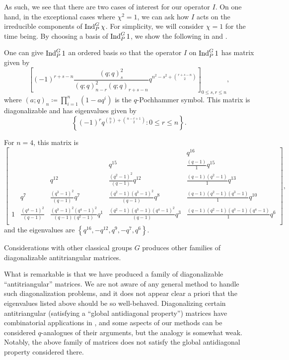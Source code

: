 \documentclass{amsart}
\begin{document}
As such, we see that there are two cases of interest for our operator $I$. On one hand, in the exceptional cases where $\chi^2=1$, we can ask how $I$ acts on the irreducible components of $\operatorname{Ind}_P^G\chi$. For simplicity, we will consider $\chi=1$ for the time being. By choosing a basis of $\operatorname{Ind}_P^G1$, we show the following in  and .
\begin{theorem}
    One can give $\operatorname{Ind}_P^G1$ an ordered basis so that the operator $I$ on $\operatorname{Ind}_P^G1$ has matrix given by
    \[\left[(-1)^{r+s-n}\frac{(q;q)_s^2}{(q;q)_{n-r}^2(q;q)_{r+s-n}}q^{n^2-s^2+\binom{r+s-n}2}\right]_{0\le s,r\le n},\]
    where $(a;q)_n\coloneqq\prod_{i=1}^n\left(1-aq^i\right)$ is the $q$-Pochhammer symbol. This matrix is diagonalizable and has eigenvalues given by
    \[\left\{(-1)^{r}q^{\binom n2+\binom{n-r+1}2}:0\le r\le n\right\}.\]
\end{theorem}
\begin{example}
    For $n=4$, this matrix is
    \[\begin{bmatrix}  &   &   &   & q^{16}\\  &   &   & q^{15}  & \frac{ ( q - 1 ) }{1} q^{15}\\  &   & q^{12}  & \frac{ ( q^{2} - 1 ) ^{2} }{ ( q - 1 ) } q^{12}  & \frac{ ( q - 1 ) ( q^{2} - 1 ) }{1} q^{13}\\  & q^{7}  & \frac{ ( q^{3} - 1 ) ^{2} }{ ( q - 1 ) } q^{7}  & \frac{ ( q^{2} - 1 ) ( q^{3} - 1 ) ^{2} }{ ( q - 1 ) } q^{8}  & \frac{ ( q - 1 ) ( q^{2} - 1 ) ( q^{3} - 1 ) }{1} q^{10}\\1 & \frac{ ( q^{4} - 1 ) ^{2} }{ ( q - 1 ) }  & \frac{ ( q^{3} - 1 ) ^{2} ( q^{4} - 1 ) ^{2} }{ ( q - 1 ) ( q^{2} - 1 ) } q^{1}  & \frac{ ( q^{2} - 1 ) ( q^{3} - 1 ) ( q^{4} - 1 ) ^{2} }{ ( q - 1 ) } q^{3}  & \frac{ ( q - 1 ) ( q^{2} - 1 ) ( q^{3} - 1 ) ( q^{4} - 1 ) }{1} q^{6}\\\end{bmatrix},\]
    and the eigenvalues are $\left\{q^{16},-q^{12},q^9,-q^7,q^6\right\}$.
\end{example}
\begin{remark}
    Considerations with other classical groups $G$ produces other families of diagonalizable antitriangular matrices.
\end{remark}
What is remarkable is that we have produced a family of diagonalizable ``antitriangular'' matrices. We are not aware of any general method to handle such diagonalization problems, and it does not appear clear a priori that the eigenvalues listed above should be so well-behaved. Diagonalizing certain antitriangular (satisfying a ``global antidiagonal property'') matrices have combinatorial applications in \cite{britnell-antitriangular}, and some aspects of our methods can be considered $q$-analogues of their arguments, but the analogy is somewhat weak. Notably, the above family of matrices does not satisfy the global antidiagonal property considered there.
\end{document}

